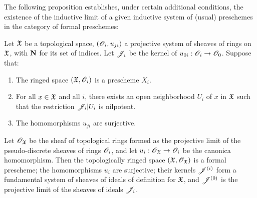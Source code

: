 The following proposition establishes, under certain additional conditions, the existence of the inductive limit of a given inductive system of (usual) preschemes in the category of formal preschemes:
\begin{prop}[10.6.3]
\label{1.10.6.3}
Let $\mathfrak{X}$ be a topological space, $(\mathscr{O}_i,u_{ji})$ a projective system of sheaves of rings on $\mathfrak{X}$, with $\mathbf{N}$ for its set of indices.
Let $\mathscr{J}_i$ be the kernel of $u_{0i}:\OO_i\to\OO_0$.
Suppose that:
\begin{enumerate}[label=\emph{(\alph*)}]
  \item The ringed space $(\mathfrak{X},\mathscr{O}_i)$ is a prescheme $X_i$.
  \item For all $x\in\mathfrak{X}$ and all $i$, there exists an open neighborhood $U_i$ of $x$ in $\mathfrak{X}$ such that the restriction $\mathscr{J}_i|U_i$ is nilpotent.
  \item The homomorphisms $u_{ji}$ are surjective.
\end{enumerate}

Let $\mathscr{O}_\mathfrak{X}$ be the sheaf of topological rings formed as the projective limit of the pseudo-discrete sheaves of rings $\mathscr{O}_i$, and let $u_i:\OO_\fk{X}\to\OO_i$ be the canonica homomorphism.
Then the topologically ringed space $(\mathfrak{X},\mathscr{O}_\mathfrak{X})$ is a formal prescheme; the homomorphisms $u_i$ are surjective; their kernels $\mathscr{J}^{(i)}$ form a fundamental system of sheaves of ideals of definition for $\mathfrak{X}$, and $\mathscr{J}^{(0)}$ is the projective limit of the sheaves of ideals $\mathscr{J}_i$.
\end{prop}

